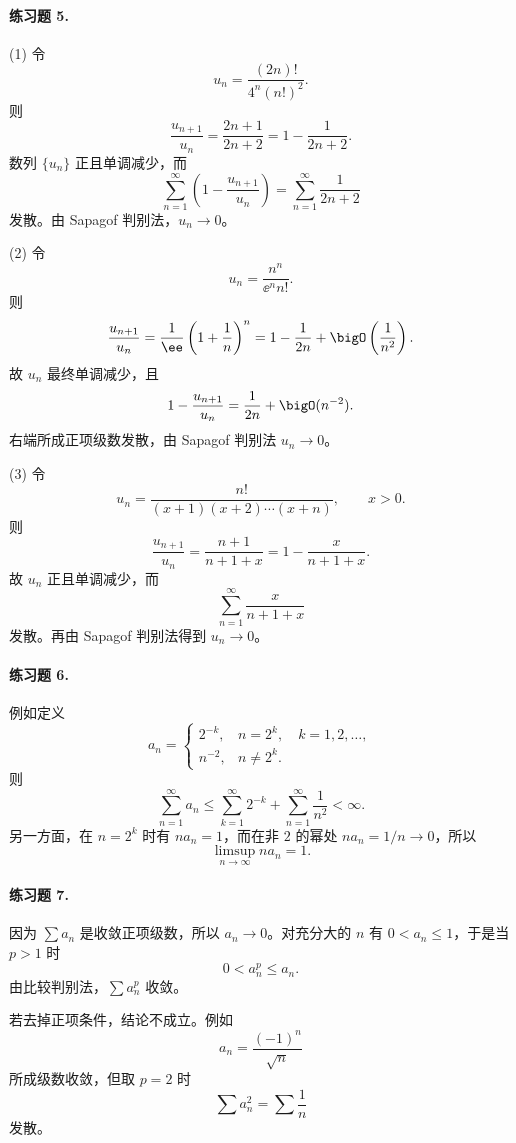 \paragraph{练习题 5.}
\begin{xsolution}
(1) 令
\[
 u_n=\frac{(2n)!}{4^n(n!)^2}.
\]
则
\[
 \frac{u_{n+1}}{u_n}=\frac{2n+1}{2n+2}
 =1-\frac1{2n+2}.
\]
数列 $\{u_n\}$ 正且单调减少，而
\[
 \sum_{n=1}^{\infty}\left(1-\frac{u_{n+1}}{u_n}\right)
 =\sum_{n=1}^{\infty}\frac1{2n+2}
\]
发散。由 Sapagof 判别法，$u_n\to0$。

(2) 令
\[
 u_n=\frac{n^n}{\ee^n n!}.
\]
则
\[
 \frac{u_{n+1}}{u_n}
 =\frac1\ee\left(1+\frac1n\right)^n
 =1-\frac1{2n}+\bigO\left(\frac1{n^2}\right).
\]
故 $u_n$ 最终单调减少，且
\[
 1-\frac{u_{n+1}}{u_n}
 =\frac1{2n}+\bigO(n^{-2}).
\]
右端所成正项级数发散，由 Sapagof 判别法 $u_n\to0$。

(3) 令
\[
 u_n=\frac{n!}{(x+1)(x+2)\cdots(x+n)},\qquad x>0.
\]
则
\[
 \frac{u_{n+1}}{u_n}=\frac{n+1}{n+1+x}
 =1-\frac{x}{n+1+x}.
\]
故 $u_n$ 正且单调减少，而
\[
 \sum_{n=1}^{\infty}\frac{x}{n+1+x}
\]
发散。再由 Sapagof 判别法得到 $u_n\to0$。
\end{xsolution}

\paragraph{练习题 6.}
\begin{xsolution}
例如定义
\[
 a_n=\begin{cases}
 2^{-k},&n=2^k,\quad k=1,2,\ldots,\\
 n^{-2},&n\neq2^k.
 \end{cases}
\]
则
\[
 \sum_{n=1}^{\infty}a_n
 \leq\sum_{k=1}^{\infty}2^{-k}+\sum_{n=1}^{\infty}\frac1{n^2}<\infty.
\]
另一方面，在 $n=2^k$ 时有 $na_n=1$，而在非 $2$ 的幂处 $na_n=1/n\to0$，所以
\[
 \limsup_{n\to\infty}na_n=1.
\]
\end{xsolution}

\paragraph{练习题 7.}
\begin{xsolution}
因为 $\sum a_n$ 是收敛正项级数，所以 $a_n\to0$。对充分大的 $n$ 有 $0<a_n\leq1$，于是当 $p>1$ 时
\[
 0<a_n^p\leq a_n.
\]
由比较判别法，$\sum a_n^p$ 收敛。

若去掉正项条件，结论不成立。例如
\[
 a_n=\frac{(-1)^n}{\sqrt n}
\]
所成级数收敛，但取 $p=2$ 时
\[
 \sum a_n^2=\sum\frac1n
\]
发散。
\end{xsolution}

